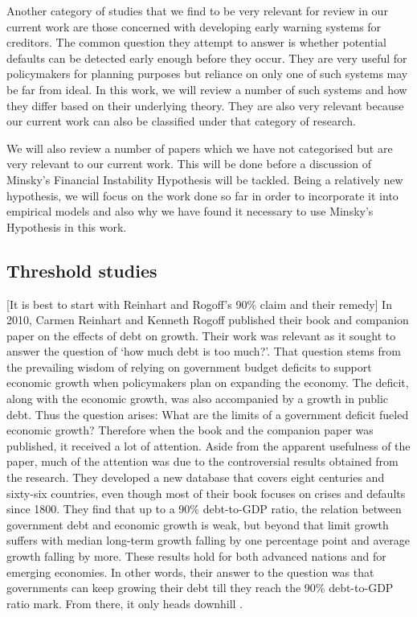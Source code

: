 \documentclass[14pt, a4paper]{article}
\begin{document}
	Another category of studies that we find to be very relevant for review in our current work are those concerned with developing early warning systems for creditors. The common question they attempt to answer is whether potential defaults can be detected early enough before they occur. They are very useful for policymakers for planning purposes but reliance on only one of such systems may be far from ideal. In this work, we will review a number of such systems and how they differ based on their underlying theory.  They are also very relevant because our current work can also be classified under that category of research.
	
	We will also review a number of papers which we have not categorised but are very relevant to our current work. This will be done before a discussion of Minsky's Financial Instability Hypothesis will be tackled. Being a relatively new hypothesis, we will focus on the work done so far in order to incorporate it into empirical models and also why we have found it necessary to use Minsky's Hypothesis in this work.
	
	
	\subsection{Threshold studies}
	[It is best to start with Reinhart and Rogoff's 90\% claim and their remedy]
	In 2010, Carmen Reinhart and Kenneth Rogoff published their book and companion paper on the effects of debt on growth. Their work was relevant as it sought to answer the question of `how much debt is too much?'. That question stems from the prevailing wisdom of relying on government budget deficits to support economic growth when policymakers plan on expanding the economy. The deficit, along with the economic growth, was also accompanied by a growth in public debt. Thus the question arises: What are the limits of a government deficit fueled economic growth? Therefore when the book and the companion paper was published, it received a lot of attention. Aside from the apparent usefulness of the paper, much of the attention was due to the controversial results obtained from the research. They developed a new database that covers eight centuries and sixty-six countries, even though most of their book focuses on crises and defaults since 1800. They find that up to a 90\% debt-to-GDP ratio, the relation between government debt and economic growth is weak, but beyond that limit growth suffers with median long-term growth falling by one percentage point and average growth falling by more. These results hold for both advanced nations and for emerging economies. In other words, their answer to the question was that governments can keep growing their debt till they reach the 90\% debt-to-GDP ratio mark. From there, it only heads downhill \cite{Reinhart2010}.
	
\end{document}
